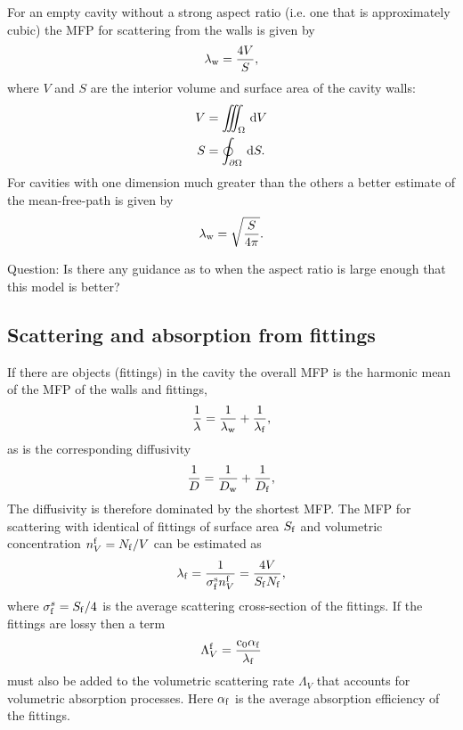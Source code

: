 \documentclass[a4paper]{article}
\numberwithin{equation}{section}
\providecommand\oiint{\oint}
\begin{document}
For an empty cavity without a strong aspect ratio (i.e. one that is approximately cubic) 
the MFP for scattering from the walls is given by
\begin{align}
\lambda_{\mathrm{w}} = \frac{4V}{S},
\end{align}
where $V$ and $S$ are the interior volume and surface area of the cavity
walls:
\begin{align}
V &= \iiint_{\Omega }\dif{V} \\
S &= \oiint_{\partial\Omega }\dif{S} .
\end{align}
For cavities with one dimension much greater than the others a better estimate
of the mean-free-path is given by
\begin{align}
\lambda_{\mathrm{w}} = \sqrt{\frac{S}{4\pi}} .
\end{align}

{\color{red}Question: Is there any guidance as to when the aspect ratio is large enough that
this model is better?}

\subsection[Scattering and absorption from fittings]{Scattering and absorption from fittings}
\label{sc:sum:fit}

If there are objects (fittings) in the cavity the overall MFP is the harmonic
mean of the MFP of the walls and fittings,
\begin{align}
\frac{1}{\lambda} = \frac{1}{\lambda_{\mathrm{w}}} + \frac{1}{\lambda_{\mathrm{f}}},
\end{align}
as is the corresponding diffusivity
\begin{align}
\frac{1}{D} = \frac{1}{D_{\mathrm{w}}} + \frac{1}{D_{\mathrm{f}}},
\end{align}
The diffusivity is therefore dominated by the shortest MFP. The MFP for
scattering with identical of fittings of surface area $S_{\mathrm{f}}$ and volumetric
concentration $n_V^{\mathrm{f}}=N_{\mathrm{f}}/V$ can be estimated as
\begin{align}
\lambda_{\mathrm{f}} = \frac{1}{\sigma_{\mathrm{f}}^{\mathrm{s}} n_V^{\mathrm{f}}} = \frac{4V}{S_{\mathrm{f}} N_{\mathrm{f}}},
\end{align}
where $\sigma_{\mathrm{f}}^s=S_{\mathrm{f}}/4$ is the average scattering cross-section of the
fittings. If the fittings are lossy then a term
\begin{align}
\Lambda_V^{\mathrm{f}} = \frac{\mathrm{c}_0\alpha_{\mathrm{f}}}{\lambda_{\mathrm{f}}}
\end{align}
must also be added to the volumetric scattering rate $\Lambda_V$ that accounts
for volumetric absorption processes. Here $\alpha_{\mathrm{f}}$ is the average
absorption efficiency of the fittings.
\end{document}
